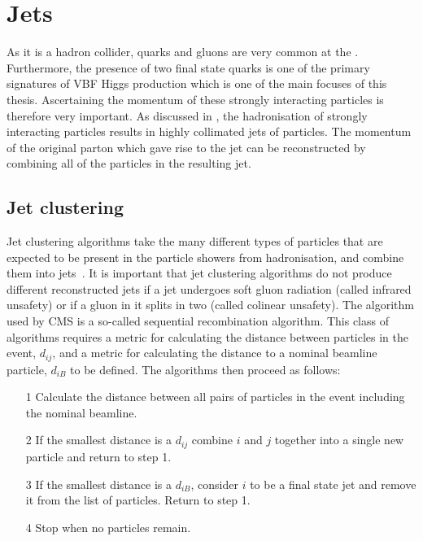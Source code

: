 \section{Jets}
\label{sec:jets}
As it is a hadron collider, quarks and gluons are very common at the \LHC. Furthermore, the presence of two final state quarks is one of the primary signatures of \ac{VBF} Higgs production which is one of the main focuses of this thesis. Ascertaining the momentum of these strongly interacting particles is therefore very important. As discussed in , the hadronisation of strongly interacting particles results in highly collimated jets of particles. The momentum of the original parton which gave rise to the jet can be reconstructed by combining all of the particles in the resulting jet.


\subsection{Jet clustering}
\label{sec:jetclustering}
Jet clustering algorithms take the many different types of particles that are expected to be present in the particle showers from hadronisation, and combine them into jets~\cite{Salam:2009jx}. It is important that jet clustering algorithms do not produce different reconstructed jets if a jet undergoes soft gluon radiation (called infrared unsafety) or if a gluon in it splits in two (called colinear unsafety). The algorithm used by CMS is a so-called sequential recombination algorithm. This class of algorithms requires a metric for calculating the distance between particles in the event, $d_{ij}$, and a metric for calculating the distance to a nominal beamline particle, $d_{iB}$ to be defined. The algorithms then proceed as follows:
\begin{itemize}
\item[1] Calculate the distance between all pairs of particles in the event including the nominal beamline.
\item[2] If the smallest distance is a $d_{ij}$ combine $i$ and $j$ together into a single new particle and return to step 1.
\item[3] If the smallest distance is a $d_{iB}$, consider $i$ to be a final state jet and remove it from the list of particles. Return to step 1.
\item[4] Stop when no particles remain.
\end{itemize}

